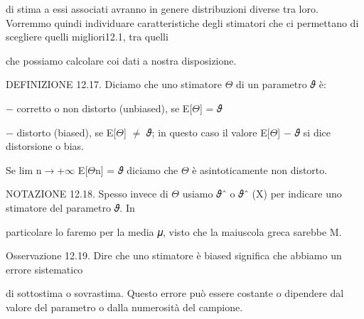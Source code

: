 \documentclass[a4paper,portrait,12pt]{article}
\begin{document}
\begin{flushleft}
di stima a essi associati avranno in genere distribuzioni diverse tra loro. Vorremmo quindi individuare caratteristiche degli stimatori che ci permettano di scegliere quelli migliori12.1, tra quelli
\end{flushleft}


\begin{flushleft}
che possiamo calcolare coi dati a nostra disposizione.
\end{flushleft}


\begin{flushleft}
DEFINIZIONE 12.17. Diciamo che uno stimatore $\Theta$ di un parametro 𝜗 \`{e}:
\end{flushleft}


\begin{flushleft}
$-$ corretto o non distorto (unbiased), se E[$\Theta$] = 𝜗
\end{flushleft}


\begin{flushleft}
$-$ distorto (biased), se E[$\Theta$] $\neq$ 𝜗; in questo caso il valore E[$\Theta$] $-$ 𝜗 si dice distorsione o bias.
\end{flushleft}


\begin{flushleft}
Se lim n$\rightarrow$+$\infty$ E[$\Theta$n] = 𝜗 diciamo che $\Theta$ \`{e} asintoticamente non distorto.
\end{flushleft}


\begin{flushleft}
NOTAZIONE 12.18. Spesso invece di $\Theta$ usiamo 𝜗ˆ o 𝜗ˆ (X) per indicare uno stimatore del parametro 𝜗. In
\end{flushleft}


\begin{flushleft}
particolare lo faremo per la media 𝜇, visto che la maiuscola greca sarebbe M.
\end{flushleft}


\begin{flushleft}
Osservazione 12.19. Dire che uno stimatore \`{e} biased significa che abbiamo un errore sistematico
\end{flushleft}


\begin{flushleft}
di sottostima o sovrastima. Questo errore pu\`{o} essere costante o dipendere dal valore del parametro o dalla numerosit\`{a} del campione.
\end{flushleft}
\end{document}
